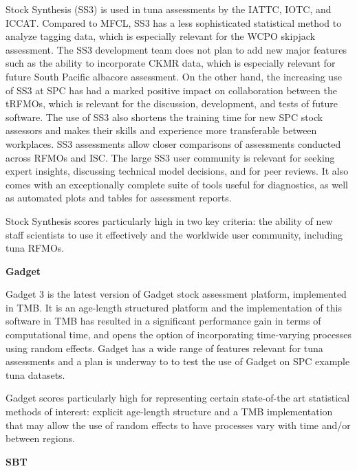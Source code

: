 \documentclass{SCreport}
\begin{document}
Stock Synthesis (SS3) is used in tuna assessments by the IATTC, IOTC, and ICCAT.
Compared to MFCL, SS3 has a less sophisticated statistical method to analyze
tagging data, which is especially relevant for the WCPO skipjack assessment. The
SS3 development team does not plan to add new major features such as the ability
to incorporate CKMR data, which is especially relevant for future South Pacific
albacore assessment. On the other hand, the increasing use of SS3 at SPC has had
a marked positive impact on collaboration between the tRFMOs, which is relevant
for the discussion, development, and tests of future software. The use of SS3
also shortens the training time for new SPC stock assessors and makes their
skills and experience more transferable between workplaces. SS3 assessments
allow closer comparisons of assessments conducted across RFMOs and ISC. The
large SS3 user community is relevant for seeking expert insights, discussing
technical model decisions, and for peer reviews. It also comes with an
exceptionally complete suite of tools useful for diagnostics, as well as
automated plots and tables for assessment reports.

Stock Synthesis scores particularly high in two key criteria: the ability of new
staff scientists to use it effectively and the worldwide user community,
including tuna RFMOs.

\vspace{1ex}

\textbf{Gadget}

\vspace{-0.5ex}

Gadget 3 is the latest version of Gadget stock assessment platform, implemented
in TMB. It is an age-length structured platform and the implementation of this
software in TMB has resulted in a significant performance gain in terms of
computational time, and opens the option of incorporating time-varying processes
using random effects. Gadget has a wide range of features relevant for tuna
assessments and a plan is underway to to test the use of Gadget on SPC example
tuna datasets.

Gadget scores particularly high for representing certain state-of-the art
statistical methods of interest: explicit age-length structure and a TMB
implementation that may allow the use of random effects to have processes vary
with time and/or between regions.

\vspace{1ex}

\textbf{SBT}
\end{document}
